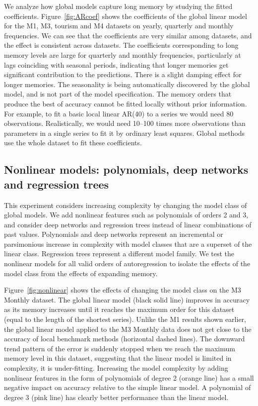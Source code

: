 \documentclass[a4paper]{article}
\theoremstyle{custom}
\begin{document}
We analyze how global models capture long memory by studying the fitted coefficients.
Figure~\ref{fig:ARcoef} shows the coefficients of the global linear model for the M1, M3, tourism and M4 datasets on yearly, quarterly and monthly frequencies. We can see that the coefficients are very similar among datasets, and the effect is consistent across datasets.
The coefficients corresponding to long memory levels are large for quarterly and monthly frequencies, particularly at lags coinciding with seasonal periods, indicating that longer memories get significant contribution to the predictions. There is a slight damping effect for longer memories. The seasonality is being automatically discovered by the global model, and is not part of the model specification. The memory orders that produce the best of accuracy cannot be fitted locally without prior information. For example, to fit a basic local linear AR(40) to a series we would need 80 observations. Realistically, we would need 10--100 times more observations than parameters in a single series to fit it by ordinary least squares. Global methods use the whole dataset to fit these coefficients.

\subsection{Nonlinear models: polynomials, deep networks and regression trees}
\label{sec:expalter}

This experiment considers increasing complexity by changing the model class of global models.
We add nonlinear features such as polynomials of orders 2 and 3, and consider deep networks and regression trees instead of linear combinations of past values.
Polynomials and deep networks represent an incremental or parsimonious increase in complexity with model classes that are a superset of the linear  class.
Regression trees represent a different model family.
We test the nonlinear models for all valid orders of autoregression to isolate the effects of the model class from the effects of expanding memory.

Figure~\ref{fig:nonlinear} shows the effects of changing the model class on the M3 Monthly dataset.
The global linear model (black solid line) improves in accuracy as its memory increases until it reaches the maximum order for this dataset (equal to the length of the shortest series).
Unlike the M1 results shown earlier, the global linear model applied to the M3 Monthly data does not get close to the accuracy of local benchmark methods (horizontal dashed lines).
The downward trend pattern of the error is suddenly stopped when we reach the maximum memory level in this dataset, suggesting that the linear model is limited in complexity, it is under-fitting.
Increasing the model complexity by adding nonlinear features in the form of polynomials of degree 2 (orange line) has a small negative impact on accuracy relative to the simple linear model.
A polynomial of degree 3 (pink line) has clearly better performance than the linear model.
\end{document}
